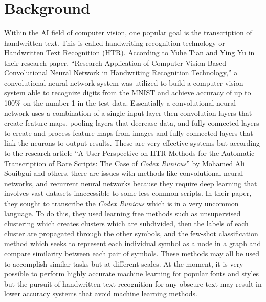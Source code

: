 \documentclass[12pt]{article}
\begin{document}
 

\begin{flushleft} 
 \\ 
 \\ 
 \\ 
\end{flushleft} 
\section{Background}
Within the AI field of computer vision, one popular goal is the transcription of handwritten text. This is called handwriting recognition technology or Handwritten Text Recognition (HTR). According to Yuhe Tian and Ying Yu in their research paper, “Research Application of Computer Vision-Based Convolutional Neural Network in Handwriting Recognition Technology,” a convolutional neural network system was utilized to build a computer vision system able to recognize digits from the MNIST and achieve accuracy of up to 100\% on the number 1 in the test data. Essentially a convolutional neural network uses a combination of a single input layer then convolution layers that create feature maps, pooling layers that decrease data, and fully connected layers to create and process feature maps from images and fully connected layers that link the neurons to output results. These are very effective systems but according to the research article “A User Perspective on HTR Methods for the Automatic Transcription of Rare Scripts: The Case of \emph{Codex Runicus}” by Mohamed Ali Souibgui and others, there are issues with methods like convolutional neural networks, and recurrent neural networks because they require deep learning that involves vast datasets inaccessible to some less common scripts. In their paper, they sought to transcribe the \emph{Codex Runicus} which is in a very uncommon language. To do this, they used learning free methods such as unsupervised clustering which creates clusters which are subdivided, then the labels of each cluster are propagated through the other symbols, and the few-shot classification method which seeks to represent each individual symbol as a node in a graph and compare similarity between each pair of symbols. These methods may all be used to accomplish similar tasks but at different scales. At the moment, it is very possible to perform highly accurate machine learning for popular fonts and styles but the pursuit of handwritten text recognition for any obscure text may result in lower accuracy systems that avoid machine learning methods.
\end{document}
